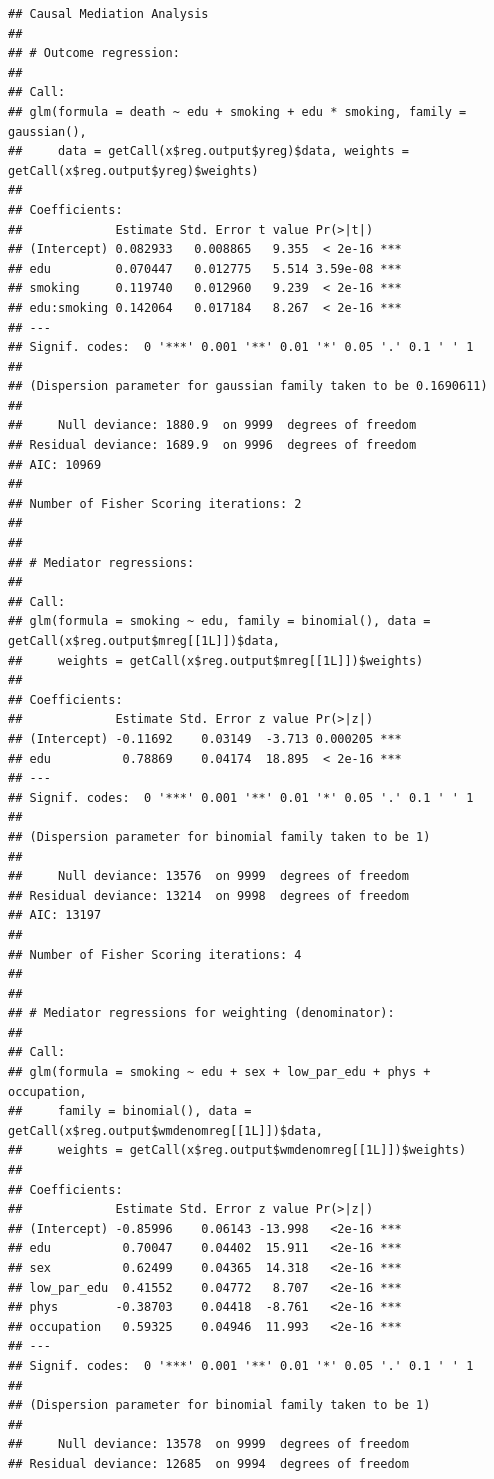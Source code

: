 \documentclass[
]{book}
\begin{document}
\begin{verbatim}
## Causal Mediation Analysis
## 
## # Outcome regression:
## 
## Call:
## glm(formula = death ~ edu + smoking + edu * smoking, family = gaussian(), 
##     data = getCall(x$reg.output$yreg)$data, weights = getCall(x$reg.output$yreg)$weights)
## 
## Coefficients:
##             Estimate Std. Error t value Pr(>|t|)    
## (Intercept) 0.082933   0.008865   9.355  < 2e-16 ***
## edu         0.070447   0.012775   5.514 3.59e-08 ***
## smoking     0.119740   0.012960   9.239  < 2e-16 ***
## edu:smoking 0.142064   0.017184   8.267  < 2e-16 ***
## ---
## Signif. codes:  0 '***' 0.001 '**' 0.01 '*' 0.05 '.' 0.1 ' ' 1
## 
## (Dispersion parameter for gaussian family taken to be 0.1690611)
## 
##     Null deviance: 1880.9  on 9999  degrees of freedom
## Residual deviance: 1689.9  on 9996  degrees of freedom
## AIC: 10969
## 
## Number of Fisher Scoring iterations: 2
## 
## 
## # Mediator regressions: 
## 
## Call:
## glm(formula = smoking ~ edu, family = binomial(), data = getCall(x$reg.output$mreg[[1L]])$data, 
##     weights = getCall(x$reg.output$mreg[[1L]])$weights)
## 
## Coefficients:
##             Estimate Std. Error z value Pr(>|z|)    
## (Intercept) -0.11692    0.03149  -3.713 0.000205 ***
## edu          0.78869    0.04174  18.895  < 2e-16 ***
## ---
## Signif. codes:  0 '***' 0.001 '**' 0.01 '*' 0.05 '.' 0.1 ' ' 1
## 
## (Dispersion parameter for binomial family taken to be 1)
## 
##     Null deviance: 13576  on 9999  degrees of freedom
## Residual deviance: 13214  on 9998  degrees of freedom
## AIC: 13197
## 
## Number of Fisher Scoring iterations: 4
## 
## 
## # Mediator regressions for weighting (denominator): 
## 
## Call:
## glm(formula = smoking ~ edu + sex + low_par_edu + phys + occupation, 
##     family = binomial(), data = getCall(x$reg.output$wmdenomreg[[1L]])$data, 
##     weights = getCall(x$reg.output$wmdenomreg[[1L]])$weights)
## 
## Coefficients:
##             Estimate Std. Error z value Pr(>|z|)    
## (Intercept) -0.85996    0.06143 -13.998   <2e-16 ***
## edu          0.70047    0.04402  15.911   <2e-16 ***
## sex          0.62499    0.04365  14.318   <2e-16 ***
## low_par_edu  0.41552    0.04772   8.707   <2e-16 ***
## phys        -0.38703    0.04418  -8.761   <2e-16 ***
## occupation   0.59325    0.04946  11.993   <2e-16 ***
## ---
## Signif. codes:  0 '***' 0.001 '**' 0.01 '*' 0.05 '.' 0.1 ' ' 1
## 
## (Dispersion parameter for binomial family taken to be 1)
## 
##     Null deviance: 13578  on 9999  degrees of freedom
## Residual deviance: 12685  on 9994  degrees of freedom

\end{verbatim}
\end{document}
